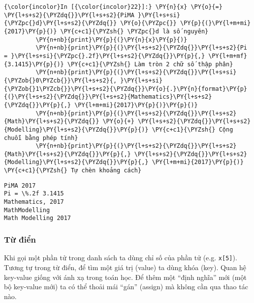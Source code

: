     
\begin{Verbatim}[commandchars=\\\{\}]
{\color{incolor}In [{\color{incolor}22}]:} \PY{n}{x} \PY{o}{=} \PY{l+s+s2}{\PYZdq{}}\PY{l+s+s2}{PiMA }\PY{l+s+si}{\PYZpc{}d}\PY{l+s+s2}{\PYZdq{}} \PY{o}{\PYZpc{}} \PY{p}{(}\PY{l+m+mi}{2017}\PY{p}{)} \PY{c+c1}{\PYZsh{} \PYZpc{}d là số nguyên}
         \PY{n+nb}{print}\PY{p}{(}\PY{n}{x}\PY{p}{)}
         \PY{n+nb}{print}\PY{p}{(}\PY{l+s+s2}{\PYZdq{}}\PY{l+s+s2}{Pi = }\PY{l+s+si}{\PYZpc{}.2f}\PY{l+s+s2}{\PYZdq{}}\PY{p}{,} \PY{l+m+mf}{3.1415}\PY{p}{)} \PY{c+c1}{\PYZsh{} Làm tròn 2 chữ số thập phân}
         \PY{n+nb}{print}\PY{p}{(}\PY{l+s+s2}{\PYZdq{}}\PY{l+s+si}{\PYZob{}0\PYZcb{}}\PY{l+s+s2}{, }\PY{l+s+si}{\PYZob{}1\PYZcb{}}\PY{l+s+s2}{\PYZdq{}}\PY{o}{.}\PY{n}{format}\PY{p}{(}\PY{l+s+s2}{\PYZdq{}}\PY{l+s+s2}{Mathematics}\PY{l+s+s2}{\PYZdq{}}\PY{p}{,} \PY{l+m+mi}{2017}\PY{p}{)}\PY{p}{)}
         \PY{n+nb}{print}\PY{p}{(}\PY{l+s+s2}{\PYZdq{}}\PY{l+s+s2}{Math}\PY{l+s+s2}{\PYZdq{}} \PY{o}{+} \PY{l+s+s2}{\PYZdq{}}\PY{l+s+s2}{Modelling}\PY{l+s+s2}{\PYZdq{}}\PY{p}{)} \PY{c+c1}{\PYZsh{} Cộng chuỗi bằng phép tính}
         \PY{n+nb}{print}\PY{p}{(}\PY{l+s+s2}{\PYZdq{}}\PY{l+s+s2}{Math}\PY{l+s+s2}{\PYZdq{}}\PY{p}{,} \PY{l+s+s2}{\PYZdq{}}\PY{l+s+s2}{Modelling}\PY{l+s+s2}{\PYZdq{}}\PY{p}{,} \PY{l+m+mi}{2017}\PY{p}{)} \PY{c+c1}{\PYZsh{} Tự chèn khoảng cách}
\end{Verbatim}
    

    \begin{Verbatim}[commandchars=\\\{\}]
PiMA 2017
Pi = \%.2f 3.1415
Mathematics, 2017
MathModelling
Math Modelling 2017

    \end{Verbatim}

    \subsubsection{Từ điển}\label{tux1eeb-ux111iux1ec3n}

    Khi gọi một phần tử trong danh sách ta dùng chỉ số của phần tử (e.g.
\texttt{x{[}5{]}}). Tương tự trong từ điển, để tìm một giá trị (value)
ta dùng khóa (key). Quan hệ key-value giống với ánh xạ trong toán học.
Để thêm một ``định nghĩa'' mới (một bộ key-value mới) ta có thể thoải
mái ``gán'' (assign) mà không cần qua thao tác nào.

